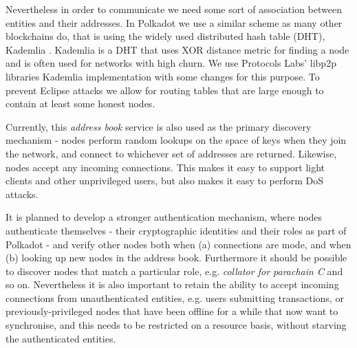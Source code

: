 Nevertheless in order to communicate we need some sort of association between entities and their addresses. In Polkadot we use a similar scheme as many other blockchains do, that is using the widely used distributed hash table (DHT), Kademlia \cite{Maymounkov:2002:Kademila}. Kademlia is a DHT that uses XOR distance metric for finding a node and is often used for networks with high churn. We use Protocols Labs' libp2p libraries \cite{} Kademlia implementation with some changes for this purpose. To prevent Eclipse attacks \cite{eclipseattack} we allow for routing tables that are large enough to contain at least some honest nodes.

Currently, this \emph{address book} service is also used as the primary discovery mechanism - nodes perform random lookups on the space of keys when they join the network, and connect to whichever set of addresses are returned. Likewise, nodes accept any incoming connections. This makes it easy to support light clients and other unprivileged users, but also makes it easy to perform DoS attacks.

It is planned to develop a stronger authentication mechanism, where nodes authenticate themselves - their cryptographic identities and their roles as part of Polkadot - and verify other nodes both when (a) connections are mode, and when (b) looking up new nodes in the address book. Furthermore it should be possible to discover nodes that match a particular role, e.g. \emph{collator for parachain C} and so on. Nevertheless it is also important to retain the ability to accept incoming connections from unauthenticated entities, e.g. users submitting transactions, or previously-privileged nodes that have been offline for a while that now want to synchronise, and this needs to be restricted on a resource basis, without starving the authenticated entities.
